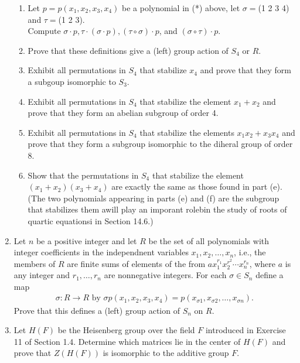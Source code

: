 \documentclass[10pt,a4paper]{report}
\begin{document}
\begin{enumerate}
\begin{enumerate}
	\item Let $p=p(x_1,x_2,x_3,x_4)$ be a polynomial in (*) above, let $\sigma=$(1 2 3 4) and $\tau=$(1 2 3).  \\Compute $\sigma\cdot p,\tau\cdot(\sigma\cdot p), (\tau\circ \sigma)\cdot p$, and $(\sigma\circ\tau)\cdot p$.
	
	\item Prove that these definitions give a (left) group action of $S_4$ or $R$.

	\item  Exhibit all permutations in $S_4$ that stabilize $x_4$ and prove that they form a subgoup isomorphic to $S_3$.
	
	\item Exhibit all permutations in $S_4$ that stabilize the element $x_1+x_2$ and prove that they form an abelian subgroup of order 4.
	
	\item Exhibit all permutations in $S_4$ that stabilize the elements $x_1x_2+x_3x_4$ and prove that they form a subgroup isomorphic to the diheral group of order 8.
	
	\item Show that the permutations in $S_4$ that stabilize the element $(x_1+x_2)(x_3+x_4)$ are exactly the same as those found in part (e). (The two polynomials appearing in parts (e) and (f) are the subgroup that stabilizes them awill play an imporant rolebin the study of roots of quartic equationsi in Section 14.6.)
\end{enumerate}

\item Let $n$ be a positive integer and let $R$ be the set of all polynomials with integer coefficients in the independnent variables $x_1, x_2, \dots, x_n$, i.e., the members of $R$ are finite sums of elements of the from $ax_1^{r_1}x_2^{r^2}\cdots x_n^{r_n}$, where $a$ is any integer and $r_1, \dots, r_n$ are nonnegative integers.  For each $\sigma \in S_n$ define a map 
\begin{align*}
	\sigma:R\to R \text{ by } \sigma p(x_1,x_2,x_3,x_4)=p(x_{\sigma{1}},x_{\sigma{2}},\dots,x_{\sigma{n}}).
\end{align*}Prove that this defines a (left) group action of $S_n$ on $R$.

\item Let $H(F)$ be the Heisenberg group over the field $F$ introduced in Exercise 11 of Section 1.4. Determine which matrices lie in the center of $H(F)$ and prove that $Z(H(F))$ is isomorphic to the additive group $F$.

\end{enumerate}
\end{document}
